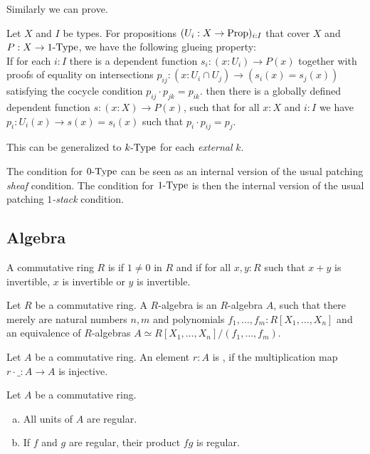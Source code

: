 Similarly we can prove.

\begin{lemma}%
  \label{kraus-glueing-1-type}
  Let $X$ and $I$ be types.
  For propositions $(U_i:X \to \mathrm{Prop})_{i:I}$ that cover $X$ 
  and $P:X\to 1\mbox{-}\mathrm{Type}$, we have the following glueing property: \\
  If for each $i:I$ there is a dependent function $s_i:(x:U_i)\to P(x)$ together with
  proofs of equality on intersections $p_{ij}:(x:U_i\cap U_j)\to (s_i(x)=s_j(x))$ satisfying the cocycle
  condition $p_{ij}\cdot p_{jk} = p_{ik}$.
  then there is a globally defined dependent function $s:(x:X) \to P(x)$,
  such that for all $x:X$ and $i:I$ we have $p_i:U_i(x) \to s(x)=s_i(x)$ such that $p_i\cdot p_{ij} = p_j$.
\end{lemma}

This can be generalized to $k\mbox{-}\mathrm{Type}$ for each {\em external} $k$.

The condition for $0\mbox{-}\mathrm{Type}$ can be seen as an internal version of the usual patching {\em sheaf} condition.
The condition for $1\mbox{-}\mathrm{Type}$ is then the internal version of the usual patching {\em $1$-stack} condition.

\subsection{Algebra}

\begin{definition}%
  \label{local-ring}
  A commutative ring $R$ is  if $1\neq 0$ in $R$ and
  if for all $x,y:R$ such that $x+y$ is invertible, $x$ is invertible or $y$ is invertible.
\end{definition}

\begin{definition}%
  Let $R$ be a commutative ring.
  A  $R$-algebra is an $R$-algebra $A$,
  such that there merely are natural numbers $n,m$ and polynomials $f_1,\dots,f_m:R[X_1,\dots,X_n]$
  and an equivalence of $R$-algebras $A\simeq R[X_1,\dots,X_n]/(f_1,\dots,f_m)$.
\end{definition}

\begin{definition}%
  \label{regular-element}
  Let $A$ be a commutative ring.
  An element $r:A$ is ,
  if the multiplication map $r\cdot\_:A\to A$ is injective.
\end{definition}

\begin{lemma}%
  \label{units-products-regular}
  Let $A$ be a commutative ring.
  \begin{enumerate}[(a)]
  \item All units of $A$ are regular.
  \item If $f$ and $g$ are regular, their product $fg$ is regular.
  \end{enumerate}
\end{lemma}

